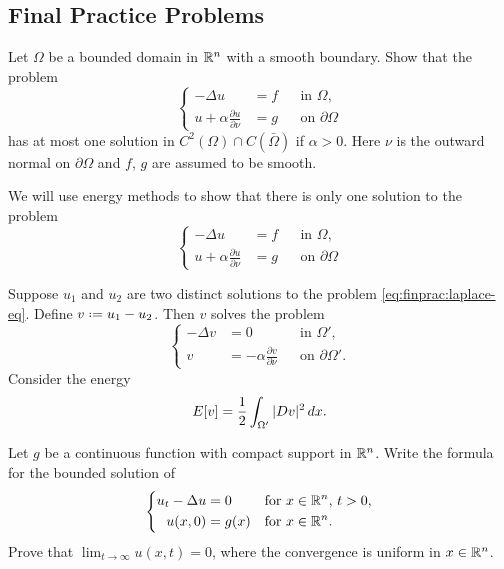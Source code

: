\subsection{Final Practice Problems}
\begin{problem}
  Let \(\Omega\) be a bounded domain in \(\mathbb{R}^n\) with a smooth
  boundary. Show that the problem
  \[
    \left\{
      \begin{aligned}
        -\Delta u&=f&&\text{in \(\Omega\),}\\
        u+\alpha\frac{\partial u}{\partial\nu}&=g&&\text{on \(\partial\Omega\)}
      \end{aligned}
    \right.
  \]
  has at most one solution in \(C^2(\Omega)\cap C(\bar\Omega)\) if
  \(\alpha>0\). Here \(\nu\) is the outward normal on \(\partial\Omega\)
  and \(f\), \(g\) are assumed to be smooth.
\end{problem}
\begin{solution*}
  We will use energy methods to show that there is only one solution to the
  problem
  \begin{equation}
    \label{eq:finprac:laplace-eq}
    \left\{
      \begin{aligned}
        -\Delta u&=f&&\text{in \(\Omega\),}\\
        u+\alpha\frac{\partial u}{\partial\nu}&=g&&\text{on \(\partial\Omega\)}
      \end{aligned}
    \right.
  \end{equation}

  Suppose \(u_1\) and \(u_2\) are two distinct solutions to the problem
  \eqref{eq:finprac:laplace-eq}. Define \(v\defeq u_1-u_2\). Then \(v\)
  solves the problem
  \[
    \left\{
      \begin{aligned}
        -\Delta v&=0&&\text{in \(\Omega'\),}\\
        v&=-\alpha\frac{\partial v}{\partial\nu}&&\text{on \(\partial\Omega'\).}
      \end{aligned}
    \right.
  \]
  Consider the energy
  \[
    E[v]=\frac{1}{2}\int_{\Omega'}|Dv|^2\mathop{}\!d x.
  \]
\end{solution*}

\begin{problem}
  Let \(g\) be a continuous function with compact support in
  \(\mathbb{R}^n\). Write the formula for the bounded solution of
  \[
    \left\{
      \begin{aligned}
        u_t-\Delta u&=0&&\text{for \(x\in\mathbb{R}^n\), \(t>0\),}\\
        u(x,0)&=g(x)&&\text{for \(x\in\mathbb{R}^n\).}
      \end{aligned}
    \right.
  \]
  Prove that \(\lim_{t\to\infty} u(x,t)=0\), where the convergence is
  uniform in \(x\in\mathbb{R}^n\).
\end{problem}
\begin{solution*}
\end{solution*}

